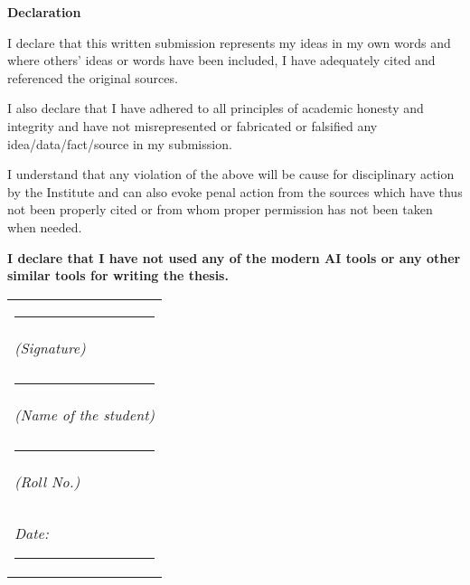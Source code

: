 

\centerline{\large\bfseries \sffamily Declaration}

\vspace{1em}

I declare that this written submission represents my ideas in my own words and where others' ideas or words have been included, I have adequately cited and referenced the original sources.

I also declare that I have adhered to all principles of academic honesty and integrity and have not
misrepresented or fabricated or falsified any idea/data/fact/source in my submission.

I understand that any violation of the above will be cause for disciplinary action by the Institute and can also evoke penal action from the sources which have thus not been properly cited or from whom proper permission has not been taken when needed.

\textbf{I declare that I have not used any of the modern AI tools or any other similar tools for writing the thesis.}
\vspace{7ex}

\renewcommand{\arraystretch}{0.8}
\begin{tabular}{l}
\rule{6cm}{0.4pt}\\
\emph{(Signature)} \\
\\
\rule{6cm}{0.4pt}\\
\emph{(Name of the student)} \\
\\
\rule{6cm}{0.4pt}\\
\emph{(Roll No.)} \\
\\
\\
\emph{Date:} \rule{4cm}{0.4pt} \\
\end{tabular}

\vspace{5em}
\newpage